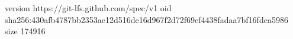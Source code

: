 version https://git-lfs.github.com/spec/v1
oid sha256:430afb4787bb2353ae12d516de16d967f2d72f69ef4438fadaa7bf16fdea5986
size 174916

